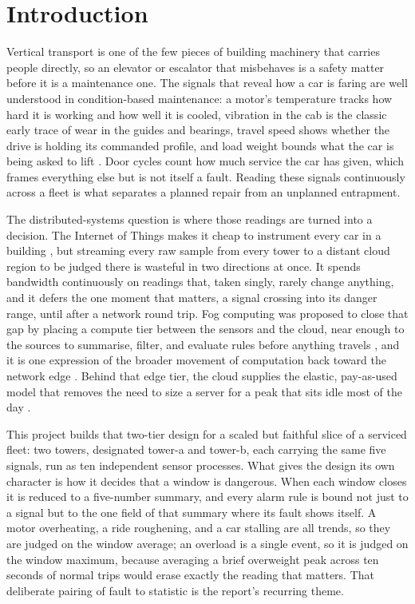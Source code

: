 \documentclass[conference]{IEEEtran}
\begin{document}
\section{Introduction}

Vertical transport is one of the few pieces of building machinery that carries people directly, so an elevator or escalator that misbehaves is a safety matter before it is a maintenance one. The signals that reveal how a car is faring are well understood in condition-based maintenance: a motor's temperature tracks how hard it is working and how well it is cooled, vibration in the cab is the classic early trace of wear in the guides and bearings, travel speed shows whether the drive is holding its commanded profile, and load weight bounds what the car is being asked to lift \cite{randall2011, jardine2006}. Door cycles count how much service the car has given, which frames everything else but is not itself a fault. Reading these signals continuously across a fleet is what separates a planned repair from an unplanned entrapment.

The distributed-systems question is where those readings are turned into a decision. The Internet of Things makes it cheap to instrument every car in a building \cite{atzori2010}, but streaming every raw sample from every tower to a distant cloud region to be judged there is wasteful in two directions at once. It spends bandwidth continuously on readings that, taken singly, rarely change anything, and it defers the one moment that matters, a signal crossing into its danger range, until after a network round trip. Fog computing was proposed to close that gap by placing a compute tier between the sensors and the cloud, near enough to the sources to summarise, filter, and evaluate rules before anything travels \cite{bonomi2012, yousefpour2019}, and it is one expression of the broader movement of computation back toward the network edge \cite{shi2016, satyanarayanan2017}. Behind that edge tier, the cloud supplies the elastic, pay-as-used model that removes the need to size a server for a peak that sits idle most of the day \cite{armbrust2010}.

This project builds that two-tier design for a scaled but faithful slice of a serviced fleet: two towers, designated tower-a and tower-b, each carrying the same five signals, run as ten independent sensor processes. What gives the design its own character is how it decides that a window is dangerous. When each window closes it is reduced to a five-number summary, and every alarm rule is bound not just to a signal but to the one field of that summary where its fault shows itself. A motor overheating, a ride roughening, and a car stalling are all trends, so they are judged on the window average; an overload is a single event, so it is judged on the window maximum, because averaging a brief overweight peak across ten seconds of normal trips would erase exactly the reading that matters. That deliberate pairing of fault to statistic is the report's recurring theme.
\end{document}

